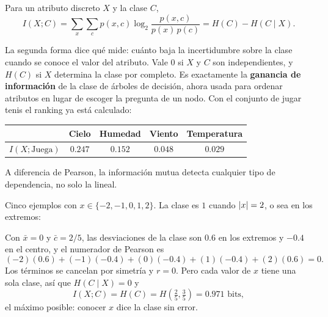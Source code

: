 \documentclass[11pt,letterpaper]{article}
\begin{document}
\begin{definicion}
    Para un atributo discreto $X$ y la clase $C$,
    \[
        I(X; C) = \sum_{x} \sum_{c} p(x, c)
                  \log_2 \frac{p(x, c)}{p(x)\, p(c)}
                = H(C) - H(C \mid X) .
    \]
\end{definicion}

La segunda forma dice qué mide: cuánto baja la incertidumbre sobre la
clase cuando se conoce el valor del atributo. Vale $0$ si $X$ y $C$ son
independientes, y $H(C)$ si $X$ determina la clase por completo. Es
exactamente la \textbf{ganancia de información} de la clase de árboles
de decisión, ahora usada para ordenar atributos en lugar de escoger la
pregunta de un nodo. Con el conjunto de jugar tenis el ranking ya está
calculado:

\begin{center}
\small
\begin{tabular}{lcccc}
    \toprule
    & Cielo & Humedad & Viento & Temperatura \\
    \midrule
    $I(X; \text{Juega})$ & $0.247$ & $0.152$ & $0.048$ & $0.029$ \\
    \bottomrule
\end{tabular}
\end{center}

A diferencia de Pearson, la información mutua detecta cualquier tipo de
dependencia, no solo la lineal.

\begin{ejemplo}
    Cinco ejemplos con $x \in \{-2, -1, 0, 1, 2\}$. La clase es $1$
    cuando $\left\lvert x \right\rvert = 2$, o sea en los extremos:
    \begin{center}
    \end{center}
    Con $\bar{x} = 0$ y $\bar{c} = 2/5$, las desviaciones de la clase
    son $0.6$ en los extremos y $-0.4$ en el centro, y el numerador de
    Pearson es
    \[
        (-2)(0.6) + (-1)(-0.4) + (0)(-0.4) + (1)(-0.4) + (2)(0.6) = 0 .
    \]
    Los términos se cancelan por simetría y $r = 0$. Pero cada valor de
    $x$ tiene una sola clase, así que $H(C \mid X) = 0$ y
    \[
        I(X; C) = H(C) = H\!\left(\tfrac{2}{5}, \tfrac{3}{5}\right)
                = 0.971 \text{ bits},
    \]
    el máximo posible: conocer $x$ dice la clase sin error.
\end{ejemplo}
\end{document}
